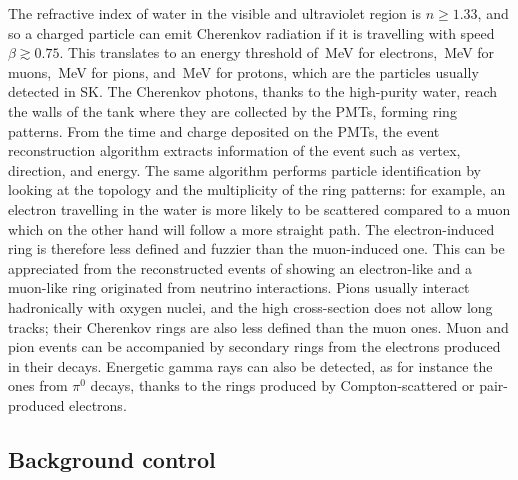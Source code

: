 The refractive index of water in the visible and ultraviolet region is $n \geq 1.33$, %
and so a charged particle can emit Cherenkov radiation if it is travelling %
with speed $\beta \gtrsim 0.75$.
This translates to an energy threshold of \,MeV for electrons, \,MeV for muons, %
\,MeV for pions, and \,MeV for protons, which are the particles usually detected in SK.
The Cherenkov photons, thanks to the high-purity water, reach the walls of the tank where they %
are collected by the PMTs, forming ring patterns.
From the time and charge deposited on the PMTs, the event reconstruction algorithm extracts information of the event %
such as vertex, direction, and energy.
The same algorithm performs particle identification by looking at the topology and the multiplicity of the ring patterns: %
for example, an electron travelling in the water is more likely to be scattered compared to a muon %
which on the other hand will follow a more straight path.
The electron-induced ring is therefore less defined and fuzzier than the muon-induced one.
This can be appreciated from the reconstructed events of  showing an electron-like and %
a muon-like ring originated from neutrino interactions.
Pions usually interact hadronically with oxygen nuclei, and the high cross-section does not allow long tracks; %
their Cherenkov rings are also less defined than the muon ones.
Muon and pion events can be accompanied by secondary rings from the electrons produced in their decays.
Energetic gamma rays can also be detected, as for instance the ones from $\pi^0$ decays, %
thanks to the rings produced by Compton-scattered or pair-produced electrons.


\subsection{Background control}
\label{sec:sk_neutron}

